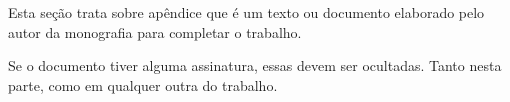 Esta seção trata sobre apêndice que é um texto ou documento elaborado pelo
autor da monografia para completar o trabalho.

Se o documento tiver alguma assinatura, essas devem ser ocultadas. Tanto nesta
parte, como em qualquer outra do trabalho.

